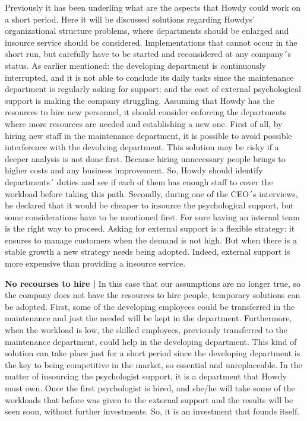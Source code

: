 Previously it has been underling what are the aspects that Howdy could work on a short period. Here it will be discussed solutions regarding Howdys' organizational structure problems, where departments should be enlarged and insource service should be considered. Implementations that cannot occur in the short run, but carefully have to be started and reconsidered at any company´s status.
As earlier mentioned: the developing department is continuously interrupted, and it is not able to conclude its daily tasks since the maintenance department is regularly asking for support; and the cost of external psychological support is making the company struggling.
Assuming that Howdy has the resources to hire new personnel, it should consider enforcing the departments where more resources are needed and establishing a new one.
First of all, by hiring new staff in the maintenance department, it is possible to avoid possible interference with the devolving department. This solution may be risky if a deeper analysis is not done first. Because hiring unnecessary people brings to higher costs and any business improvement. So, Howdy should identify departments´ duties and see if each of them has enough staff to cover the workload before taking this path.
Secondly, during one of the CEO´s interviews, he declared that it would be cheaper to insource the psychological support, but some considerations have to be mentioned first. 
For sure having an internal team is the right way to proceed. Asking for external support is a flexible strategy: it ensures to manage customers when the demand is not high. But when there is a stable growth a new strategy needs being adopted. Indeed, external support is more expensive than providing a insource service. 

\noindent\textbf{No recourses to hire |} In this case that our assumptions are no longer true, so the company does not have the resources to hire people, temporary solutions can be adopted. First, some of the developing employees could be transferred in the maintenance and just the needed will be kept in the department. Furthermore, when the workload is low, the skilled employees, previously transferred to the maintenance department, could help in the developing department. This kind of solution can take place just for a short period since the developing department is the key to being competitive in the market, so essential and unreplaceable. In the matter of insourcing the psychologist support, it is a department that Howdy must own. Once the first psychologist is hired, and she/he will take some of the workloads that before was given to the external support and the results will be seen soon, without further investments. So, it is an investment that founds itself.


